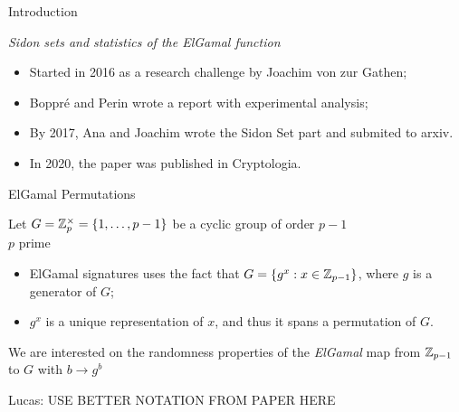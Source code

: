 
\begin{frame}{Introduction}
    \begin{center}
        \emph{Sidon sets and statistics of the ElGamal function} \\
        \citet*{boppre2020sidon}
    \end{center}
    
    \begin{itemize}
        \item Started in 2016 as a research challenge by Joachim von zur Gathen;
        \item Boppré and Perin wrote a report with experimental analysis;
        \item By 2017, Ana and Joachim wrote the Sidon Set part and submited to arxiv.
        \item In 2020, the paper was published in Cryptologia.
    \end{itemize}
\end{frame}


\begin{frame}{ElGamal Permutations}

    Let $G = \mathbb{Z}_p^\times = \{1, \ldots, p-1\}$ be a cyclic group of order $p-1$\\
    $p$ prime

    \pause
    \begin{itemize}
        \item ElGamal signatures uses the fact that $G = \{ g^x : x\in \mathbb{Z}_{p-1}\}$, where $g$ is a generator of $G$;
        \item $g^x$ is a unique representation of $x$, and thus it spans a permutation of $G$.
    \end{itemize}
    \pause
    We are interested on the randomness properties of the \emph{ElGamal} map from $\mathbb{Z}_{p-1}$ to $G$ with $b \to g^b $
    
    Lucas: USE BETTER NOTATION FROM PAPER HERE
\end{frame}


